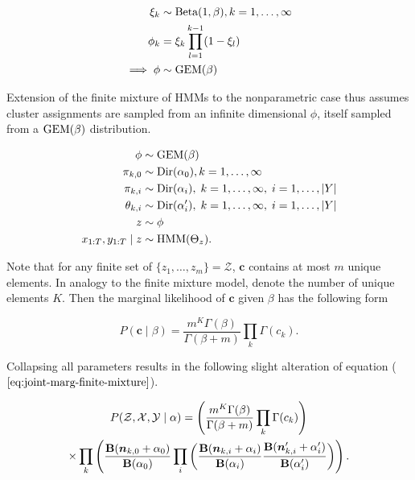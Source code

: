 \documentclass[12pt]{report}
\newcommand{\p}[0]{\prime}
\newcommand{\1}[0]{\mathbbm{1}}
\newcommand{\Beta}[0]{\textnormal{Beta}}
\newcommand{\Dir}[0]{\textnormal{Dir}}
\newcommand{\GEM}[0]{\textnormal{GEM}}
\newcommand{\HMM}[0]{\textnormal{HMM}}
\newcommand{\Bf}[0]{\text{\textbf{B}}}
\newcommand{\seq}[3]{\ensuremath{#1_{{#2}:{#3}}}}
\DeclarePairedDelimiter\abs{\lvert}{\rvert}%
\begin{document}
\begin{align*}
    \xi_k & \sim \Beta(1, \beta), k = 1,\ldots,\infty\\
    \phi_k & = \xi_k \prod_{l=1}^{k-1} (1 - \xi_l) \\
    \implies \phi & \sim \GEM(\beta) \\
\end{align*}

Extension of the finite mixture of \acp{HMM} to the nonparametric case thus assumes cluster
assignments are sampled from an infinite dimensional $\phi$, itself sampled
from a $\GEM(\beta)$ distribution.

\begin{align*}
    \phi & \sim \GEM(\beta) \\
    \pi_{k,0} & \sim \Dir(\alpha_0), k=1,\ldots,\infty \\
    \pi_{k,i} & \sim \Dir(\alpha_i),\; k=1,\ldots,\infty,\; i=1,\ldots,\abs{Y} \\
    \theta_{k,i} & \sim \Dir(\alpha_i^\p),\; k=1,\ldots,\infty,\; i = 1,\ldots,\abs{Y} \\
    z & \sim \phi \\
    \seq{x}{1}{T}, \seq{y}{1}{T} \mid z & \sim \HMM(\Theta_z).
\end{align*}

Note that for any finite set of $\{z_1, \ldots, z_m\} = \mathcal{Z}$,
$\bm{c}$ contains at most $m$ unique elements. In analogy to the finite
mixture model, denote the number of unique elements $K$. Then the marginal likelihood
of $\bm{c}$ given $\beta$ has the following form \cite{kyung-estimation-dirichlet}

\begin{equation}\label{dp-marg}
    P(\bm{c} \mid \beta) = \frac{m^K \Gamma(\beta)}{\Gamma(\beta + m)} \prod_k \Gamma(c_k).
\end{equation}

Collapsing all parameters results in the following slight alteration of
equation ($\ref{eq:joint-marg-finite-mixture}$).

\begin{multline}
    P(\mathcal{Z}, \mathcal{X}, \mathcal{Y} \mid \alpha) =
    \left(\frac{m^K \Gamma(\beta)}{\Gamma(\beta + m)} \prod_k \Gamma(c_k)\right) \\
    \times \prod_k
    \left(
        \frac{\Bf(\bm{n}_{k,0} + \alpha_0)}{\Bf(\alpha_0)}
        \prod_i
        \left(
            \frac{\Bf(\bm{n}_{k,i} + \alpha_i)}{\Bf(\alpha_i)}
            \frac{\Bf(\bm{n}_{k,i}^\p + \alpha_i^\p)}{\Bf(\alpha_i^\p)}
        \right)
    \right). \label{eq:joint-marg-infinite-mixture}
\end{multline}
\end{document}
